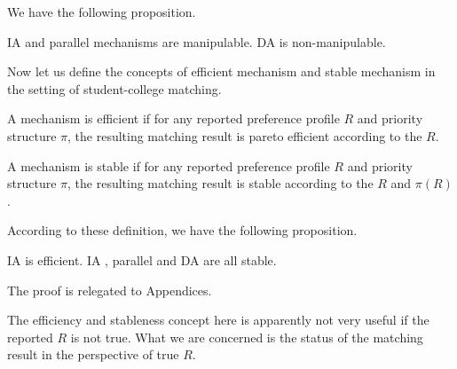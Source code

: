 We have the following proposition.

\begin{prop}
IA and parallel mechanisms are manipulable. DA is non-manipulable.
\end{prop}

 
Now let us define the concepts of efficient mechanism and stable
mechanism in the setting of student-college matching.

\begin{definition}
A mechanism is efficient if for any reported preference profile $R$ and
priority structure $\pi$, the resulting matching result is pareto
efficient according to the $R$.
\end{definition}


\begin{definition}
A mechanism is stable if for any reported preference profile $R$ and
priority structure $\pi$, the resulting matching result is stable according to the $R$ and $\pi(R)$.
\end{definition}

According to these definition, we have the following proposition.

\begin{prop}
IA is efficient. IA , parallel and DA are all stable.
\end{prop}

The proof is relegated to Appendices.

\begin{remark}
The efficiency and stableness concept here is apparently not very useful if
the reported $R$ is not true. What we are concerned is the status of the matching
result in the perspective of true $R$.
\end{remark}

